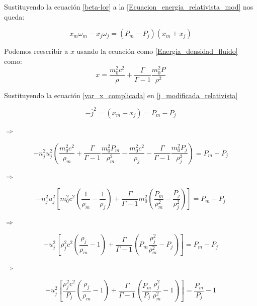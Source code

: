 \documentclass[12pt,a4paper]{book}
\begin{document}
Sustituyendo la ecuación \ref{beta-lor} a la \ref{Ecuacion_energia_relativista_mod} nos queda:

\begin{equation} \label{Choque adiabatico}
x_m \omega_m- x_j \omega_j = \left( P_m-P_j \right) \left( x_m+x_j \right) 
\end{equation}

Podemos reescribir a $x$ usando la ecuación  como \ref{Energia_densidad_fluido} como:
\begin{equation} \label{var_x_complicada}
x= \frac{m_0^2 c^2}{\rho}+ \frac{\Gamma}{\Gamma-1}\frac{m_0^2 P}{\rho^2}
\end{equation}

Sustituyendo la ecuación \ref{var_x_complicada} en \ref{j_modificada_relativista}

\begin{equation}
-\overline{j}^{2} = \left( x_m - x_j \right) = P_m - P_j
\end{equation}

$\Rightarrow$

\begin{equation}
-n_j^2 u_j^2 \left(\frac{m_0^2 c^2}{\rho_m} +
\frac{\Gamma}{\Gamma-1} \frac{m_0^2 P_m}{\rho_m^2}-
\frac{m_0^2 c^2}{\rho_j}-
\frac{\Gamma}{\Gamma-1} \frac{m_0^2 P_j}{\rho_j^2} \right) = 
P_m - P_j
\end{equation}

$\Rightarrow$

\begin{equation}
-n_j^2 u_j^2 
\left[m_0^2 c^2 \left( \frac{1}{\rho_m} - \frac{1}{\rho_j} \right)+
\frac{\Gamma}{\Gamma-1} m_0^2 \left( \frac{P_m}{\rho_m^2}- \frac{P_j}{\rho_j^2}\right) \right] = 
P_m - P_j
\end{equation}

$\Rightarrow$

\begin{equation}
-u_j^2 
\left[\rho_j^2 c^2 \left( \frac{\rho_j}{\rho_m} - 1 \right)+
\frac{\Gamma}{\Gamma-1} \left( P_m \frac{\rho_j^2}{\rho_m^2} - P_j \right) \right] = 
P_m - P_j
\end{equation}

$\Rightarrow$

\begin{equation}
-u_j^2 
\left[\frac{\rho_j^2 c^2}{P_j}  \left( \frac{\rho_j}{\rho_m} - 1 \right)+
\frac{\Gamma}{\Gamma-1} \left( \frac{P_m}{P_j} \frac{\rho_j^2}{\rho_m^2} - 1 \right) \right] = 
\frac{P_m}{P_j} - 1
\end{equation}
\end{document}
